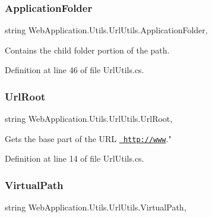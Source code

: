 \subsubsection{\texorpdfstring{ApplicationFolder}{ApplicationFolder}}
{\footnotesize\ttfamily string Web\+Application.\+Utils.\+Url\+Utils.\+Application\+Folder\hspace{0.3cm}{\ttfamily [static]}, {\ttfamily [get]}}



Contains the child folder portion of the path. 



Definition at line 46 of file Url\+Utils.\+cs.

\mbox{\label{classWebApplication_1_1Utils_1_1UrlUtils_adb71e72849d963175e4d427584e9c0e4}} 
\subsubsection{\texorpdfstring{UrlRoot}{UrlRoot}}
{\footnotesize\ttfamily string Web\+Application.\+Utils.\+Url\+Utils.\+Url\+Root\hspace{0.3cm}{\ttfamily [static]}, {\ttfamily [get]}}



Gets the base part of the U\+RL \textquotesingle{}\href{http://www}{\texttt{ http\+://www}}." 



Definition at line 14 of file Url\+Utils.\+cs.

\mbox{\label{classWebApplication_1_1Utils_1_1UrlUtils_ac5f6af06d5225617fed36065df2f3d25}} 
\subsubsection{\texorpdfstring{VirtualPath}{VirtualPath}}
{\footnotesize\ttfamily string Web\+Application.\+Utils.\+Url\+Utils.\+Virtual\+Path\hspace{0.3cm}{\ttfamily [static]}, {\ttfamily [get]}}



